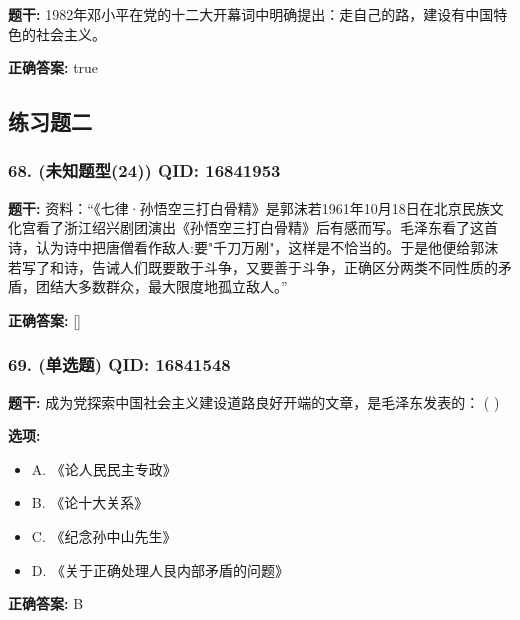 \documentclass[12pt,UTF8]{ctexart}
\begin{document}
\textbf{题干:}
1982年邓小平在党的十二大开幕词中明确提出：走自己的路，建设有中国特色的社会主义。

\textbf{正确答案:}
true

\vspace{0.3em}\hrulefill\vspace{0.7em}

\subsection*{练习题二}

\subsubsection*{68. (未知题型(24)) \small QID: 16841953}

\textbf{题干:}
资料：“《七律·孙悟空三打白骨精》是郭沫若1961年10月18日在北京民族文化宫看了浙江绍兴剧团演出《孙悟空三打白骨精》后有感而写。毛泽东看了这首诗，认为诗中把唐僧看作敌人:要"千刀万剐"，这样是不恰当的。于是他便给郭沫若写了和诗，告诫人们既要敢于斗争，又要善于斗争，正确区分两类不同性质的矛盾，团结大多数群众，最大限度地孤立敌人。”

\textbf{正确答案:}
[]

\vspace{0.3em}\hrulefill\vspace{0.7em}

\subsubsection*{69. (单选题) \small QID: 16841548}

\textbf{题干:}
成为党探索中国社会主义建设道路良好开端的文章，是毛泽东发表的： ( )

\textbf{选项:}
\begin{itemize}[leftmargin=*]

  \item A. 《论人民民主专政》

  \item B. 《论十大关系》

  \item C. 《纪念孙中山先生》

  \item D. 《关于正确处理人艮内部矛盾的问题》

\end{itemize}

\textbf{正确答案:}
B

\vspace{0.3em}\hrulefill\vspace{0.7em}
\end{document}
